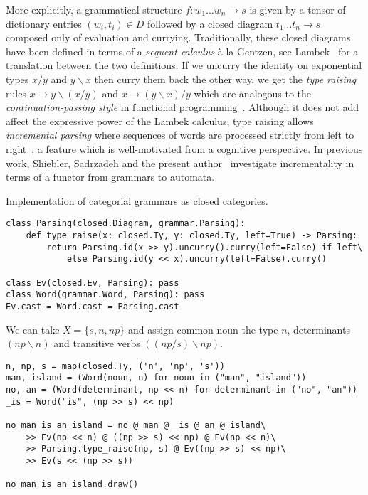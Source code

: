 More explicitly, a grammatical structure $f : w_1 \dots w_n \to s$ is given by a tensor of dictionary entries $(w_i, t_i) \in D$ followed by a closed diagram $t_1 \dots t_n \to s$ composed only of evaluation and currying.
Traditionally, these closed diagrams have been defined in terms of a \emph{sequent calculus} à la Gentzen, see Lambek~\cite{Lambek88} for a translation between the two definitions.
If we uncurry the identity on exponential types $x / y$ and $y \backslash x$ then curry them back the other way, we get the \emph{type raising} rules $x \to y \backslash (x / y)$ and $x \to (y \backslash x) / y$ which are analogous to the \emph{continuation-passing style} in functional programming~\cite{DeGroote01}.
Although it does not add affect the expressive power of the Lambek calculus, type raising allows \emph{incremental parsing} where sequences of words are processed strictly from left to right~\cite{Dowty88,Steedman91}, a feature which is well-motivated from a cognitive perspective.
In previous work, Shiebler, Sadrzadeh and the present author~\cite{ShieblerEtAl20} investigate incrementality in terms of a functor from grammars to automata.

\begin{python}
{\normalfont Implementation of categorial grammars as closed categories.}

\begin{verbatim}
class Parsing(closed.Diagram, grammar.Parsing):
    def type_raise(x: closed.Ty, y: closed.Ty, left=True) -> Parsing:
        return Parsing.id(x >> y).uncurry().curry(left=False) if left\
            else Parsing.id(y << x).uncurry(left=False).curry()

class Ev(closed.Ev, Parsing): pass
class Word(grammar.Word, Parsing): pass
Ev.cast = Word.cast = Parsing.cast
\end{verbatim}
\end{python}

\begin{example}
We can take $X = \{ s, n, np \}$ and assign common noun the type $n$, determinants $(np \backslash n)$ and transitive verbs $((np / s) \backslash np)$.

\begin{verbatim}
n, np, s = map(closed.Ty, ('n', 'np', 's'))
man, island = (Word(noun, n) for noun in ("man", "island"))
no, an = (Word(determinant, np << n) for determinant in ("no", "an"))
_is = Word("is", (np >> s) << np)

no_man_is_an_island = no @ man @ _is @ an @ island\
    >> Ev(np << n) @ ((np >> s) << np) @ Ev(np << n)\
    >> Parsing.type_raise(np, s) @ Ev((np >> s) << np)\
    >> Ev(s << (np >> s))

no_man_is_an_island.draw()
\end{verbatim}
\end{example}

